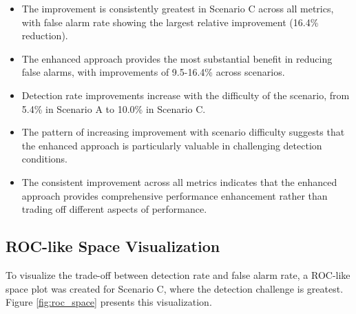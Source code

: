 \begin{itemize}
    \item The improvement is consistently greatest in Scenario C across all metrics, with false alarm rate showing the largest relative improvement (16.4\% reduction).
    
    \item The enhanced approach provides the most substantial benefit in reducing false alarms, with improvements of 9.5-16.4\% across scenarios.
    
    \item Detection rate improvements increase with the difficulty of the scenario, from 5.4\% in Scenario A to 10.0\% in Scenario C.
    
    \item The pattern of increasing improvement with scenario difficulty suggests that the enhanced approach is particularly valuable in challenging detection conditions.
    
    \item The consistent improvement across all metrics indicates that the enhanced approach provides comprehensive performance enhancement rather than trading off different aspects of performance.
\end{itemize}

\subsection{ROC-like Space Visualization}

To visualize the trade-off between detection rate and false alarm rate, a ROC-like space plot was created for Scenario C, where the detection challenge is greatest. Figure \ref{fig:roc_space} presents this visualization.

